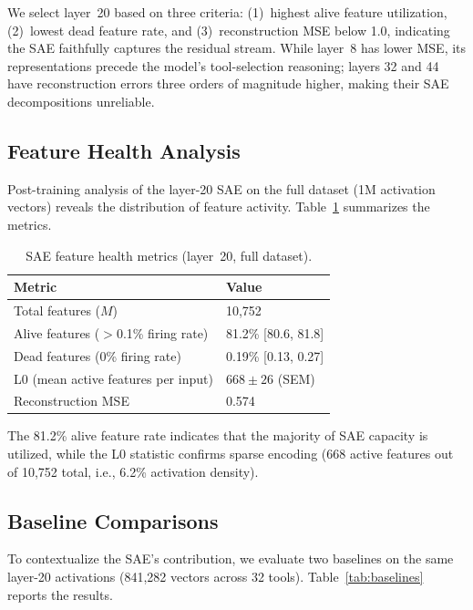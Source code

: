 \documentclass[runningheads]{llncs}
\begin{document}
We select layer~20 based on three criteria: (1)~highest alive feature utilization, (2)~lowest dead feature rate, and (3)~reconstruction MSE below 1.0, indicating the SAE faithfully captures the residual stream. While layer~8 has lower MSE, its representations precede the model's tool-selection reasoning; layers 32 and 44 have reconstruction errors three orders of magnitude higher, making their SAE decompositions unreliable.

\subsection{Feature Health Analysis}

Post-training analysis of the layer-20 SAE on the full dataset (1M activation vectors) reveals the distribution of feature activity. Table~\ref{tab:health} summarizes the metrics.

\begin{table}[t]
\caption{SAE feature health metrics (layer~20, full dataset).}
\label{tab:health}
\centering
\begin{tabular}{ll}
\toprule
Metric & Value \\
\midrule
Total features ($M$) & 10,752 \\
Alive features ($>$0.1\% firing rate) & 81.2\% [80.6, 81.8] \\
Dead features (0\% firing rate) & 0.19\% [0.13, 0.27] \\
L0 (mean active features per input) & $668 \pm 26$ (SEM) \\
Reconstruction MSE & 0.574 \\
\bottomrule
\end{tabular}
\end{table}

The 81.2\% alive feature rate indicates that the majority of SAE capacity is utilized, while the L0 statistic confirms sparse encoding (668 active features out of 10,752 total, i.e., 6.2\% activation density).

\subsection{Baseline Comparisons}

To contextualize the SAE's contribution, we evaluate two baselines on the same layer-20 activations (841,282 vectors across 32 tools). Table~\ref{tab:baselines} reports the results.
\end{document}
